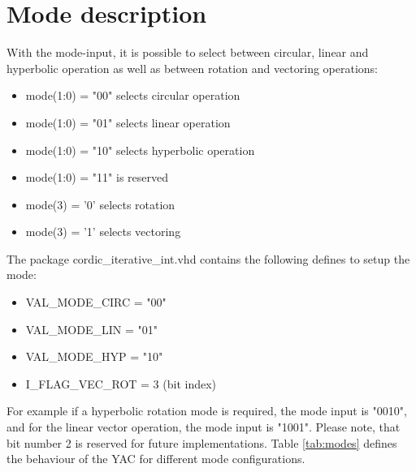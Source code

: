 \documentclass[a4paper, 12pt, notitlepage]{report}
\begin{document}
\section{Mode description}
With the mode-input, it is possible to select between circular, linear and hyperbolic 
operation as well as between rotation and vectoring operations:
\begin{itemize}
\item mode(1:0) = "00" selects circular operation
\item mode(1:0) = "01" selects linear operation
\item mode(1:0) = "10" selects hyperbolic operation
\item mode(1:0) = "11" is reserved
\item mode(3) = '0' selects rotation
\item mode(3) = '1' selects vectoring
\end{itemize}
The package cordic\_iterative\_int.vhd contains the following defines to
setup the mode:
\begin{itemize}
   \item VAL\_MODE\_CIRC = "00" 
   \item VAL\_MODE\_LIN  = "01" 
   \item VAL\_MODE\_HYP  = "10" 
   \item I\_FLAG\_VEC\_ROT = 3 (bit index)
\end{itemize}
For example if a hyperbolic rotation mode is required, the mode input is "0010", 
and for the linear vector operation, the mode input is "1001".
Please note, that bit number 2 is reserved for future implementations.\newline
Table \ref{tab:modes} defines the behaviour of the YAC 
for different mode configurations.
\end{document}
